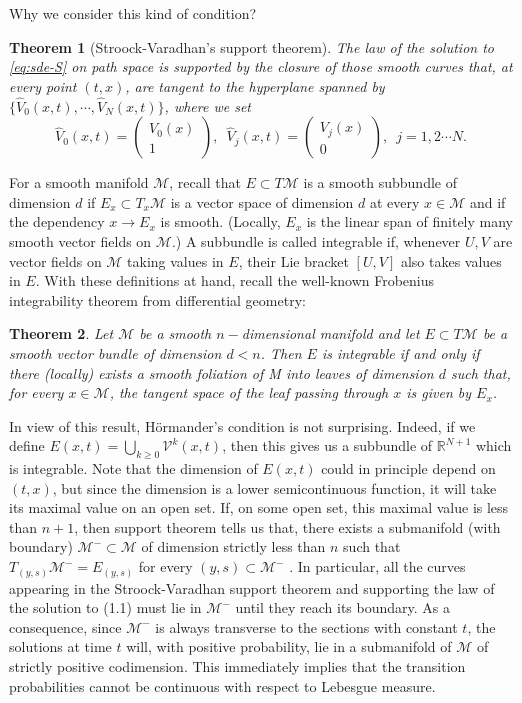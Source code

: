 \documentclass[twoside, 12pt]{book}
\numberwithin{equation}{chapter}
\newtheorem{theorem}{Theorem}[section]
\def\cM{{\mathcal M}}
\def\mR{{\mathbb R}}
\def\sV{{\mathscr V}}
\def\geq{\geqslant}
\begin{document}
	Why we consider this kind of condition? 
	
	\begin{theorem}[Stroock-Varadhan's support theorem]
		The law of the solution to \eqref{eq:sde-S} on path space is supported by the closure of those smooth curves that, at every point $(t, x)$, are tangent to the hyperplane spanned by $\{\hat{V}_0(x,t), \cdots , \hat{V}_N(x,t)\}$, where we set 
		$$\hat{V}_0(x,t)=\begin{pmatrix} V_0(x)\\ 1 \end{pmatrix},  \,\,\, \hat{V}_j(x,t)=\begin{pmatrix} V_j(x)\\ 0 \end{pmatrix}, \,\,\, j=1,2\cdots N. $$
	\end{theorem}
	
	
	
	For a smooth manifold $\cM$, recall that $E \subset T\cM$ is a smooth subbundle of dimension $d$ if $E_x \subset T_x\cM$ is a vector space of dimension $d$ at every $x \in \cM$ and if the dependency $x \to E_x$ is smooth. (Locally, $E_x$ is the linear span of finitely many smooth vector fields on $\cM$.) A subbundle is called integrable if, whenever $U, V$ are vector fields on $\cM$ taking values in $E$, their Lie bracket $[U, V ]$ also takes values in $E$.
	With these definitions at hand, recall the well-known Frobenius integrability theorem from differential geometry:
	\begin{theorem}
		Let $\cM $ be a smooth $n-$dimensional manifold and let $E \subset T \cM$ be a smooth vector bundle of dimension $d < n$. Then $E $ is integrable if and only if there (locally) exists a smooth foliation of M into leaves of dimension $d$ such that, for every $x\in  \cM$, the tangent space of the leaf passing through $x$ is given by $E_x$.
		
	\end{theorem}
	
	In view of this result, H\"ormander’s condition is not surprising. Indeed, if we define $E(x,t) = \bigcup_{k\geq 0} \sV^k(x,t)$, then this gives us a subbundle of $\mR^{N+1}$ which
	is integrable. Note that the dimension of $E(x,t)$ could in principle depend on $(t, x)$, but since the dimension is a lower semicontinuous function, it will take its maximal value on an open set. If, on some open set, this maximal value is less than $n + 1$, then support theorem tells us that, there exists a submanifold (with boundary) $\cM^- \subset \cM$ of dimension strictly less than $n$ such that $T_{(y,s)}\cM^- = E_{(y,s)}$ for every $(y, s) \subset \cM^-$ . In particular, all the curves appearing in the Stroock-Varadhan support theorem and supporting the law of the solution to (1.1) must lie in $\cM^-$ until they reach its boundary. As a consequence, since $\cM^-$ is always transverse to the sections with constant $t$, the solutions at time $t$ will, with positive probability, lie in a submanifold of $\cM$ of strictly positive codimension. This immediately implies that the transition probabilities cannot be continuous with respect to Lebesgue measure.
	
\end{document}
